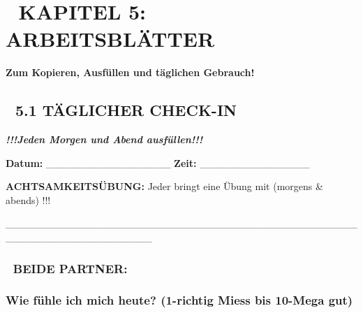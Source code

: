 %


\hypertarget{kapitel-5-arbeitsbluxe4tter}{%
\section{📝 KAPITEL 5: ARBEITSBLÄTTER}\label{kapitel-5-arbeitsbluxe4tter}}

\textbf{Zum Kopieren, Ausfüllen und täglichen Gebrauch!}

\hypertarget{tuxe4glicher-check-in}{%
\subsection{\texorpdfstring{📅 \textbf{5.1 TÄGLICHER CHECK-IN}}{📅 5.1 TÄGLICHER CHECK-IN}}\label{tuxe4glicher-check-in}}

\emph{\textbf{!!!Jeden Morgen und Abend ausfüllen!!!}}

\textbf{Datum:} \_\_\_\_\_\_\_\_\_\_\_\_\_\_\_\_\_ \textbf{Zeit:} \_\_\_\_\_\_\_\_\_\_\_\_\_\_\_

\textbf{ACHTSAMKEITSÜBUNG:} Jeder bringt eine Übung mit (morgens \& abends) !!!

\_\_\_\_\_\_\_\_\_\_\_\_\_\_\_\_\_\_\_\_\_\_\_\_\_\_\_\_\_\_\_\_\_\_\_\_\_\_\_\_\_\_\_\_\_\_\_\_\_\_\_\_\_\_\_\_\_\_\_\_\_\_\_\_\_\_\_\_

\hypertarget{section}{%
\subsubsection{}\label{section}}

\hypertarget{beide-partner}{%
\subsubsection{\texorpdfstring{\textbf{👫 BEIDE PARTNER:} }{👫 BEIDE PARTNER: }}\label{beide-partner}}

\hypertarget{wie-fuxfchle-ich-mich-heute-1-richtig-miess-bis-10-mega-gut}{%
\subsubsection{\texorpdfstring{\textbf{Wie fühle ich mich heute? (1-richtig Miess bis 10-Mega gut)}}{Wie fühle ich mich heute? (1-richtig Miess bis 10-Mega gut)}}\label{wie-fuxfchle-ich-mich-heute-1-richtig-miess-bis-10-mega-gut}}

